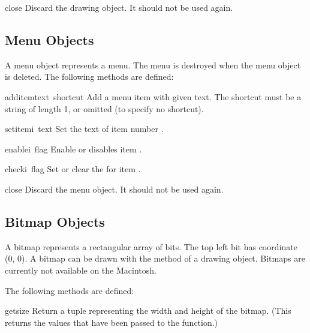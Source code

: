 \begin{funcdesc}{close}{}
Discard the drawing object.  It should not be used again.
\end{funcdesc}

\subsection{Menu Objects}

A menu object represents a menu.
The menu is destroyed when the menu object is deleted.
The following methods are defined:


\begin{funcdesc}{additem}{text\, shortcut}
Add a menu item with given text.
The shortcut must be a string of length 1, or omitted (to specify no
shortcut).
\end{funcdesc}

\begin{funcdesc}{setitem}{i\, text}
Set the text of item number
.
\end{funcdesc}

\begin{funcdesc}{enable}{i\, flag}
Enable or disables item
.
\end{funcdesc}

\begin{funcdesc}{check}{i\, flag}
Set or clear the
for item
.
\end{funcdesc}

\begin{funcdesc}{close}{}
Discard the menu object.  It should not be used again.
\end{funcdesc}

\subsection{Bitmap Objects}

A bitmap represents a rectangular array of bits.
The top left bit has coordinate (0, 0).
A bitmap can be drawn with the  method of a drawing object.
Bitmaps are currently not available on the Macintosh.

The following methods are defined:


\begin{funcdesc}{getsize}{}
Return a tuple representing the width and height of the bitmap.
(This returns the values that have been passed to the 
function.)
\end{funcdesc}

